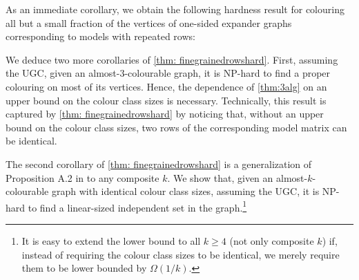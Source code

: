 As an immediate corollary, we obtain the following hardness result for colouring all but a small fraction of the vertices of one-sided expander graphs corresponding to models with repeated rows:


We deduce two more corollaries of \cref{thm: finegrainedrowshard}. First, assuming the UGC, given an almost-$3$-colourable graph, it is NP-hard to find a proper colouring on most of its vertices.
Hence, the dependence of \cref{thm:3alg} on an upper bound on the colour class sizes is necessary.
Technically, this result is captured by \cref{thm: finegrainedrowshard} by noticing that, without an upper bound on the colour class sizes, two rows of the corresponding model matrix can be identical.


The second corollary of \cref{thm: finegrainedrowshard} is a generalization of Proposition A.2 in \cite{bafna-hsieh-kothari} to any composite $k$. We show that, given an almost-$k$-colourable graph with identical colour class sizes, assuming the UGC, it is NP-hard to find a linear-sized independent set in the graph.\footnote{It is easy to extend the lower bound to all $k \geq 4$ (not only composite $k$) if, instead of requiring the colour class sizes to be identical, we merely require them to be lower bounded by $\Omega(1/k)$.}

